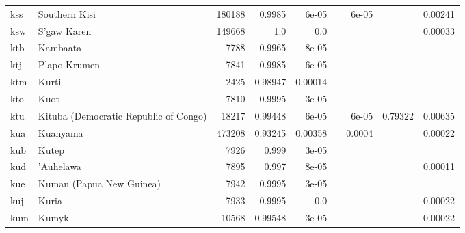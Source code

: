 \documentclass[11pt]{article}
\begin{document}
\begin{table*}[h]
{\begin{tabular}{llrrrrrrr}
kss         & Southern Kisi         & 180188         & 0.9985         & 6e-05         &          & 6e-05         &          & 0.00241         \\

ksw         & S'gaw Karen         & 149668         & 1.0         & 0.0         &          &          &          & 0.00033         \\

ktb         & Kambaata         & 7788         & 0.9965         & 8e-05         &          &          &          &          \\

ktj         & Plapo Krumen         & 7841         & 0.9985         & 6e-05         &          &          &          &          \\

ktm         & Kurti         & 2425         & 0.98947         & 0.00014         &          &          &          &          \\

kto         & Kuot         & 7810         & 0.9995         & 3e-05         &          &          &          &          \\

ktu         & Kituba (Democratic Republic of Congo)         & 18217         & 0.99448         & 6e-05         &          & 6e-05         & 0.79322         & 0.00635         \\

kua         & Kuanyama         & 473208         & 0.93245         & 0.00358         &          & 0.0004         &          & 0.00022         \\

kub         & Kutep         & 7926         & 0.999         & 3e-05         &          &          &          &          \\

kud         & 'Auhelawa         & 7895         & 0.997         & 8e-05         &          &          &          & 0.00011         \\

kue         & Kuman (Papua New Guinea)         & 7942         & 0.9995         & 3e-05         &          &          &          &          \\

kuj         & Kuria         & 7933         & 0.9995         & 0.0         &          &          &          & 0.00022         \\

kum         & Kumyk         & 10568         & 0.99548         & 3e-05         &          &          &          & 0.00022         \\


\end{tabular}}
\end{table*}
\end{document}
